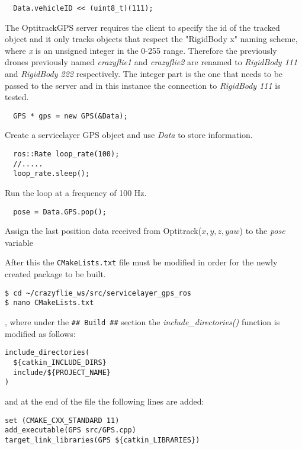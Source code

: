 \begin{verbatim}
  Data.vehicleID << (uint8_t)(111);
\end{verbatim}
\noindent The OptitrackGPS server requires the client to specify the id of the tracked object and it only tracks objects that respect the "RigidBody x" naming scheme, where \textit{x} is an unsigned integer in the 0-255 range. Therefore the previously drones previously named \textit{crazyflie1} and \textit{crazyflie2} are renamed to \textit{RigidBody 111} and \textit{RigidBody 222} respectively. The integer part is the one that needs to be passed to the server and in this instance the connection to \textit{RigidBody 111} is tested.

\begin{verbatim}
  GPS * gps = new GPS(&Data);
\end{verbatim}
\noindent Create a servicelayer GPS object and use \textit{Data} to store information.

\begin{verbatim}
  ros::Rate loop_rate(100);
  //.....
  loop_rate.sleep();
\end{verbatim}
\noindent Run the loop at a frequency of 100 Hz.

\begin{verbatim}
  pose = Data.GPS.pop();
\end{verbatim}
\noindent Assign the last position data received from Optitrack($x,y,z, yaw$) to the \textit{pose} variable

\noindent After this the \texttt{CMakeLists.txt} file must be modified in order for the newly created package to be built.

\begin{mdframed}[backgroundcolor=light-gray, linecolor=light-gray]
\begin{verbatim}
$ cd ~/crazyflie_ws/src/servicelayer_gps_ros
$ nano CMakeLists.txt
\end{verbatim}
\end{mdframed}

\noindent , where under the \texttt{\#\# Build \#\#} section the \textit{include\_directories()} function is modified as follows:
\begin{verbatim}
include_directories(
  ${catkin_INCLUDE_DIRS}
  include/${PROJECT_NAME}
)
\end{verbatim}
\noindent and at the end of the file the following lines are added:
\begin{verbatim}
set (CMAKE_CXX_STANDARD 11)
add_executable(GPS src/GPS.cpp)
target_link_libraries(GPS ${catkin_LIBRARIES})
\end{verbatim}

